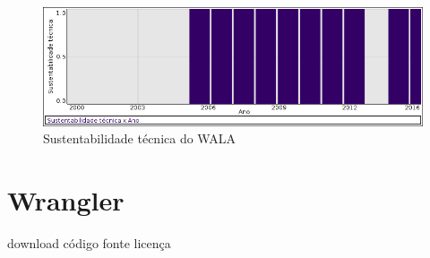 \begin{figure}[h]
  \center
  \includegraphics[scale=0.50]{imagens/softwares-charts/wala.png}
  \caption{Sustentabilidade técnica do WALA}
\end{figure}


\section{Wrangler}
\checkmark download
\checkmark código fonte
\checkmark licença


